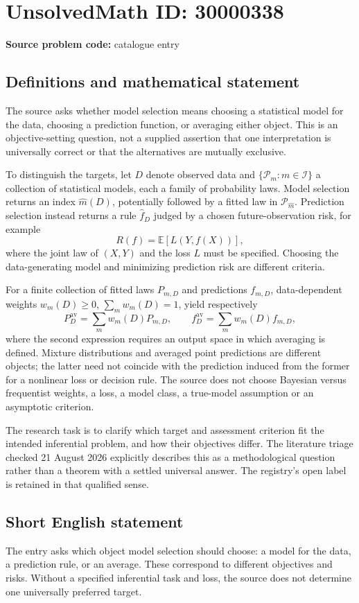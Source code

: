 \documentclass[11pt]{article}
\begin{document}
\section*{UnsolvedMath ID: 30000338}
\textbf{Source problem code:} catalogue entry
\subsection{Definitions and mathematical statement}
The source asks whether model selection means choosing a statistical model for the data, choosing a prediction function, or averaging either object. This is an objective-setting question, not a supplied assertion that one interpretation is universally correct or that the alternatives are mutually exclusive.

To distinguish the targets, let $D$ denote observed data and $\{\mathcal P_m:m\in\mathcal I\}$ a collection of statistical models, each a family of probability laws. Model selection returns an index $\widehat m(D)$, potentially followed by a fitted law in $\mathcal P_{\widehat m}$. Prediction selection instead returns a rule $\widehat f_D$ judged by a chosen future-observation risk, for example
\[
 R(f)=\mathbb E[L(Y,f(X))],
\]
where the joint law of $(X,Y)$ and the loss $L$ must be specified. Choosing the data-generating model and minimizing prediction risk are different criteria.

For a finite collection of fitted laws $P_{m,D}$ and predictions $f_{m,D}$, data-dependent weights $w_m(D)\geq0$, $\sum_mw_m(D)=1$, yield respectively
\[
 P_D^{\mathrm{av}}=\sum_m w_m(D)P_{m,D},\qquad
 f_D^{\mathrm{av}}=\sum_m w_m(D)f_{m,D},
\]
where the second expression requires an output space in which averaging is defined. Mixture distributions and averaged point predictions are different objects; the latter need not coincide with the prediction induced from the former for a nonlinear loss or decision rule. The source does not choose Bayesian versus frequentist weights, a loss, a model class, a true-model assumption or an asymptotic criterion.

The research task is to clarify which target and assessment criterion fit the intended inferential problem, and how their objectives differ. The literature triage checked 21 August 2026 explicitly describes this as a methodological question rather than a theorem with a settled universal answer. The registry's open label is retained in that qualified sense.
\subsection{Short English statement}
The entry asks which object model selection should choose: a model for the data, a prediction rule, or an average. These correspond to different objectives and risks. Without a specified inferential task and loss, the source does not determine one universally preferred target.
\end{document}
